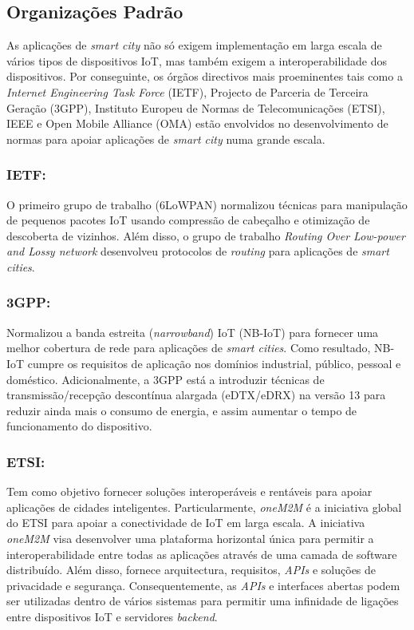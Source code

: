 \documentclass{llncs}
\begin{document}
    
    \subsection{Organizações Padrão}
    As aplicações de \textit{smart city} não só exigem implementação em larga escala de
    vários tipos de dispositivos IoT, mas também exigem a interoperabilidade dos dispositivos.
    Por conseguinte, os órgãos directivos mais proeminentes tais como a \textit{Internet Engineering
    Task Force} (IETF), Projecto de Parceria de Terceira Geração (3GPP), Instituto Europeu de Normas
    de Telecomunicações (ETSI), IEEE e Open Mobile Alliance (OMA) estão envolvidos no
    desenvolvimento de normas para apoiar aplicações de \textit{smart city} numa grande escala.
    
    \subsubsection{IETF:} 
    O primeiro grupo de trabalho (6LoWPAN) normalizou técnicas para manipulação de pequenos
    pacotes IoT usando compressão de cabeçalho e otimização de descoberta de vizinhos.
    Além disso, o grupo de trabalho \textit{Routing Over Low-power and Lossy network} desenvolveu
    protocolos de \textit{routing} para aplicações de \textit{smart cities}. 
    
    \subsubsection{3GPP:}
    Normalizou a banda estreita (\textit{narrowband}) IoT (NB-IoT) para fornecer uma melhor cobertura 
    de rede para aplicações de \textit{smart cities}. Como resultado, NB-IoT cumpre os requisitos de aplicação
    nos domínios industrial, público, pessoal e doméstico. Adicionalmente, a 3GPP está a introduzir técnicas 
    de transmissão/recepção descontínua alargada (eDTX/eDRX) na versão 13 para reduzir ainda mais o consumo
    de energia, e assim aumentar o tempo de funcionamento do dispositivo.
    
    \subsubsection{ETSI:}
    Tem como objetivo fornecer soluções interoperáveis e rentáveis para apoiar aplicações de cidades inteligentes.
    Particularmente, \textit{oneM2M} é a iniciativa global do ETSI para apoiar a conectividade de IoT em larga escala.
    A iniciativa \textit{oneM2M} visa desenvolver uma plataforma horizontal única para permitir a
    interoperabilidade entre todas as aplicações através de uma camada de software distribuído. Além disso, fornece arquitectura, requisitos, \textit{APIs} e soluções de privacidade e segurança. Consequentemente, as \textit{APIs} e interfaces abertas podem ser utilizadas dentro de vários sistemas para permitir uma infinidade de ligações entre dispositivos IoT e servidores \textit{backend}.
    
\end{document}
